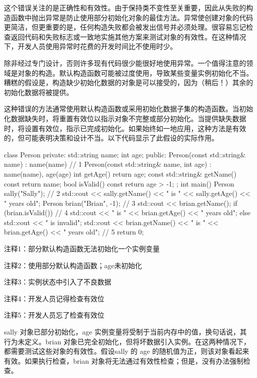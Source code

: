 这个错误关注的是正确性和有效性。由于保持类不变性至关重要，因此从失败的构造函数中抛出异常是防止使用部分初始化对象的最佳方法。异常使创建对象的代码更简洁，但更重要的是，任何构造失败都会被发出信号并必须处理。很容易忘记检查返回代码和失败标志或一致地实施其他方案来测试对象的有效性。在这种情况下，开发人员使用异常时花费的开发时间比不使用时少。


除非经过专门设计，否则许多现有代码很少能很好地使用异常。一个值得注意的领域是对象的构造。默认构造函数可能被过度使用，导致某些变量实例初始化不当。糟糕的假设是，构造缺少初始化数据的对象是可以接受的，因为（稍后！）其余的初始化数据将被提供。

这种错误的方法通常使用默认构造函数或采用初始化数据子集的构造函数。当初始化数据缺失时，将重置有效位以指示对象不完整或部分初始化。当提供缺失数据时，将设置有效位，指示已完成初始化。如果始终如一地应用，这种方法是有效的，但可能表明决策和设计不当。以下代码显示了此假设的实际作用。


\begin{cpp}
class Person {
private:
  std::string name;
  int age;
public:
  Person(const std::string& name) : name(name) {} // 1
  Person(const std::string& name, int age) : name(name), age(age) {}
  int getAge() { return age; }
  const std::string& getName() const { return name; }
  bool isValid() const { return age > -1; }
};
int main() {
  Person sally("Sally"); // 2
  std::cout << sally.getName() << " is " << sally.getAge()
    << " years old\n";
  Person brian("Brian", -1); // 3
  std::cout << brian.getName();
  if (brian.isValid()) // 4
    std::cout << " is " << brian.getAge() << " years old\n";
  else
    std::cout << " is invalid\n";
  std::cout << brian.getName() << " is " << brian.getAge() <<
    " years old\n"; // 5
  return 0;
}
\end{cpp}

{\footnotesize
注释1：部分默认构造函数无法初始化一个实例变量

注释2：使用部分默认构造函数；age未初始化

注释3：实例状态中引入了不良数据

注释4：开发人员记得检查有效位

注释5：开发人员忘了检查有效位
}

sally 对象已部分初始化，age 实例变量将受制于当前内存中的值，换句话说，其行为未定义。brian 对象已完全初始化，但将坏数据引入实例。在这两种情况下，都需要测试这些对象的有效性。假设sally 的 age 的随机值为正，则该对象看起来有效。如果执行检查，brian 对象将无法通过有效性检查；但是，没有办法强制检查。

